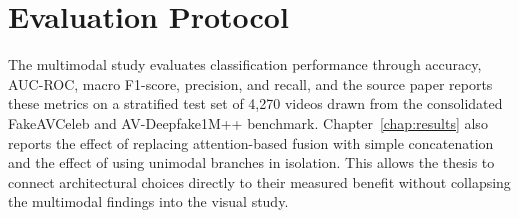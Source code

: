 \section{Evaluation Protocol}

The multimodal study evaluates classification performance through accuracy, AUC-ROC, macro F1-score, precision, and recall, and the source paper reports these metrics on a stratified test set of 4,270 videos drawn from the consolidated FakeAVCeleb and AV-Deepfake1M++ benchmark. Chapter~\ref{chap:results} also reports the effect of replacing attention-based fusion with simple concatenation and the effect of using unimodal branches in isolation. This allows the thesis to connect architectural choices directly to their measured benefit without collapsing the multimodal findings into the visual study.